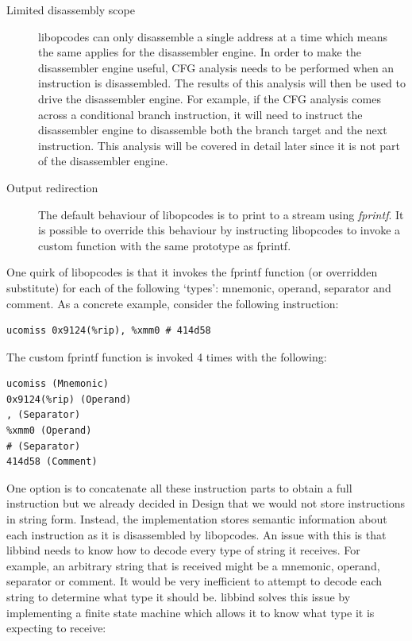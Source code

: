 \begin{description}
\item [Limited disassembly scope] libopcodes can only disassemble a single address at a time which means the same applies for the disassembler engine. In order to make the disassembler engine useful, CFG analysis needs to be performed when an instruction is disassembled. The results of this analysis will then be used to drive the disassembler engine. For example, if the CFG analysis comes across a conditional branch instruction, it will need to instruct the disassembler engine to disassemble both the branch target and the next instruction. This analysis will be covered in detail later since it is not part of the disassembler engine.
\item [Output redirection] The default behaviour of libopcodes is to print to a stream using \emph{fprintf}. It is possible to override this behaviour by instructing libopcodes to invoke a custom function with the same prototype as fprintf.
\end{description}

One quirk of libopcodes is that it invokes the fprintf function (or overridden substitute) for each of the following `types': mnemonic, operand, separator and comment. As a concrete example, consider the following instruction:

\noindent\begin{minipage}{\textwidth}
\begin{lstlisting}[language={[x86masm]Assembler},caption={Example instruction disassembled by libopcodes.}]
ucomiss 0x9124(%rip), %xmm0 # 414d58
\end{lstlisting}
\end{minipage}

The custom fprintf function is invoked 4 times with the following:

\noindent\begin{minipage}{\textwidth}
\begin{lstlisting}[language={[x86masm]Assembler},caption={Strings received by custom fprintf. Type information is included for the benefit of the reader but is not given by libopcodes.}]
ucomiss (Mnemonic)
0x9124(%rip) (Operand)
, (Separator)
%xmm0 (Operand)
# (Separator)
414d58 (Comment)
\end{lstlisting}
\end{minipage}

One option is to concatenate all these instruction parts to obtain a full instruction but we already decided in Design that we would not store instructions in string form. Instead, the implementation stores semantic information about each instruction as it is disassembled by libopcodes. An issue with this is that libbind needs to know how to decode every type of string it receives. For example, an arbitrary string that is received might be a mnemonic, operand, separator or comment. It would be very inefficient to attempt to decode each string to determine what type it should be. libbind solves this issue by implementing a finite state machine which allows it to know what type it is expecting to receive:


